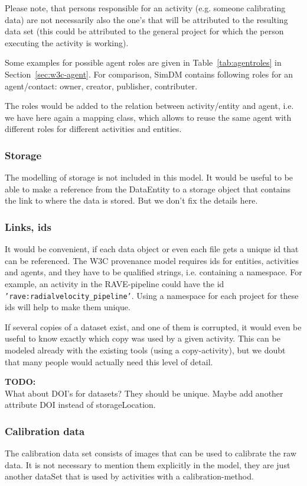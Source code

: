 \documentclass[11pt,a4paper]{ivoa}
\newcommand{\TODO}[1]{%
    \noindent%
    \colorbox{todocolor}{%
            \parbox{0.85\linewidth}{\sffamily \textbf{TODO:}\\
            #1}
    }%
    \vspace{2pt}

}
\begin{document}
Please note, that persons responsible for an activity (e.g. someone calibrating data) are not necessarily also the one's that will be attributed to the resulting data set (this could 
be attributed to the general project for which the person executing the activity is working).

Some examples for possible agent roles are given in Table~\ref{tab:agentroles}
in Section~\ref{sec:w3c-agent}. For comparison, SimDM contains following roles for 
an agent/contact: owner, creator, publisher, contributer.

The roles would be added to the relation between activity/entity and agent, 
i.e. we have here again a mapping class, which allows to reuse the same agent 
with different roles for different activities and entities.


\subsubsection{Storage}
The modelling of storage is not included in this model. 
It would be useful to be able to make a reference from the DataEntity to a storage
object that contains the link to where the data is stored. But we don't fix the 
details here.


\subsubsection{Links, ids}\label{sec:links_between_data}
It would be convenient, if each data object or even each file 
gets a unique id that can be referenced. The W3C provenance model requires ids
for entities, activities and agents, and they have to be qualified strings, 
i.e. containing a namespace. For example, an activity in the RAVE-pipeline could 
have the id \texttt{'rave:radialvelocity\_pipeline'}. Using a namespace for each 
project for these ids will help to make them unique. 

If several copies of a dataset exist, and one of them is corrupted, it would even be useful to know
exactly which copy was used by a given activity. This can be modeled already 
with the existing tools (using a copy-activity), but we doubt that many people
would actually need this level of detail.

\TODO{What about DOI's for datasets? They should be unique. Maybe add another
attribute DOI instead of storageLocation.}


\subsubsection{Calibration data}
The calibration data set consists of images that can be used to calibrate the
raw data. It is not necessary to mention them explicitly in the model, 
they are just another dataSet that is used by activities with a 
calibration-method.
\end{document}
